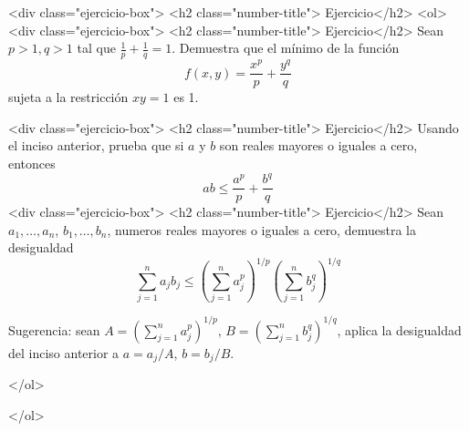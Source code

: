 \documentclass{article}
\theoremstyle{definition}
\begin{document}
        <div class="ejercicio-box"> <h2 class="number-title"> Ejercicio</h2>
          <ol>
          <div class="ejercicio-box"> <h2 class="number-title"> Ejercicio</h2> Sean $p>1, q>1$ tal que $\frac{1}{p}+\frac{1}{q}=1$. Demuestra
            que el mínimo de la función
            $$
            f(x,y)=\frac{x^p}{p}+\frac{y^q}{q}
            $$
            sujeta a la restricción $xy=1$ es 1.

          <div class="ejercicio-box"> <h2 class="number-title"> Ejercicio</h2> Usando el inciso anterior, prueba que si $a$ y $b$ son
            reales mayores o iguales a cero, entonces
            $$
            ab \leq \frac{a^p}{p}+\frac{b^q}{q}
            $$
          <div class="ejercicio-box"> <h2 class="number-title"> Ejercicio</h2> Sean $a_1,\dots, a_n$, $b_1,\dots, b_n$, numeros
            reales mayores o iguales a cero, demuestra la desigualdad
            $$
            \sum_{j=1}^n a_jb_j \leq \left( \sum_{j=1}^n a_j^p \right)^{1/p}
            \left( \sum_{j=1}^n b_j^q \right)^{1/q}
            $$

            Sugerencia: sean $A=\left( \sum_{j=1}^n a_j^p \right)^{1/p}$,
            $B=\left( \sum_{j=1}^n b_j^q \right)^{1/q}$, aplica
            la desigualdad del inciso anterior a $a=a_j/A$, $b=b_j/B$.
         
          </ol>
          
            
          </ol>
          

          

	
  
       
\end{document}
